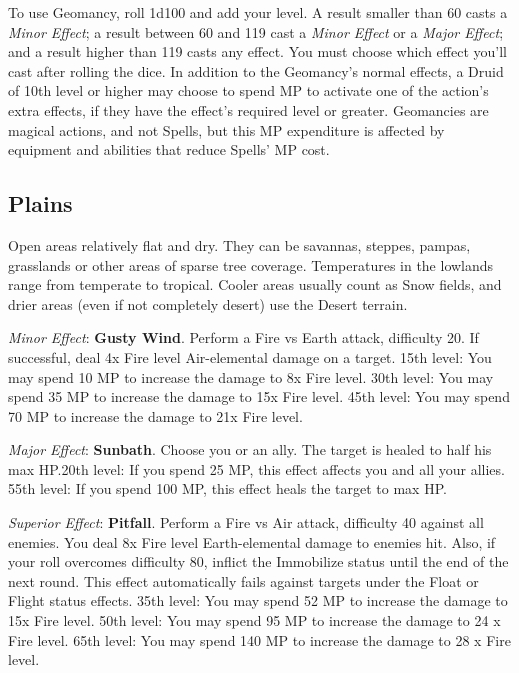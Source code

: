 To use Geomancy, roll 1d100 and add your level. A result smaller than 60 casts a \textit{Minor Effect}; a result between 60 and 119 cast a \textit{Minor Effect} or a \textit{Major Effect}; and a result higher than 119 casts any effect.  You must choose which effect you'll cast after rolling the dice. In addition to the Geomancy’s normal  effects, a Druid of 10th level or higher may choose to spend MP to activate one of the action’s extra effects,  if they have the effect’s required level or greater. Geomancies are magical actions, and not Spells, but this  MP expenditure is affected by equipment and abilities that reduce Spells’ MP cost.

\begin{multicols}{2}
\subsection*{Plains}\label{subsec:geo-plains}
	
Open areas relatively flat and dry. They can be savannas, steppes, pampas, grasslands or other areas of sparse tree coverage. Temperatures in the  lowlands range from temperate to tropical. Cooler  areas usually count as Snow fields, and drier areas  (even if not completely desert) use the Desert  terrain.

\textit{Minor Effect}: \textbf{Gusty Wind}. Perform a Fire vs Earth attack, difficulty 20. If successful, deal 4x Fire level Air-elemental damage on a target. 15th level: You may spend 10 MP to increase the damage to 8x Fire level. 30th level: You may spend 35 MP to increase the damage to 15x Fire level. 45th level: You may spend 70 MP to increase the damage to 21x Fire level.

\textit{Major Effect}: \textbf{Sunbath}. Choose you or an ally. The target is healed to half his max HP.\@{}20th level: If you spend 25 MP, this effect affects you and all your allies. 55th level: If you spend 100 MP, this effect heals the target to max HP.\@{}%

\textit{Superior Effect}: \textbf{Pitfall}. Perform a Fire vs Air attack, difficulty 40 against all enemies. You deal 8x Fire level Earth-elemental damage to enemies hit. Also, if your roll overcomes difficulty 80, inflict the Immobilize status until the end of the next round. This effect automatically fails against targets under the Float or Flight status effects. 35th level: You may spend 52 MP to increase the damage to 15x Fire level. 50th level: You may spend 95 MP to increase the damage to 24 x Fire level. 65th level: You may spend 140 MP to increase the damage to 28 x Fire level.


\end{multicols}
